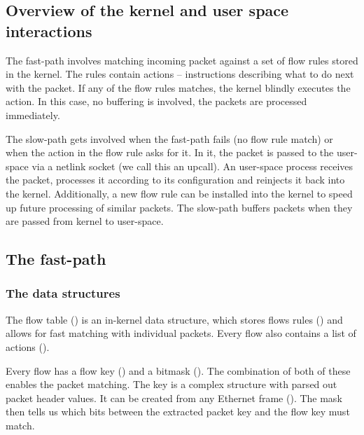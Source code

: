 \subsection{Overview of the kernel and user space interactions}
\label{overview-of-the-kernel-and-user-space-interactions}

The fast-path involves matching incoming packet against a set of flow rules stored in the kernel. The rules contain actions -- instructions describing what to do next with the packet. If any of the flow rules matches, the kernel blindly executes the action. In this case, no buffering is involved, the packets are processed immediately.

The slow-path gets involved when the fast-path fails (no flow rule match) or when the action in the flow rule asks for it. In it, the packet is passed to the user-space via a netlink socket (we call this an upcall). An user-space process receives the packet, processes it according to its configuration and reinjects it back into the kernel. Additionally, a new flow rule can be installed into the kernel to speed up future processing of similar packets. The slow-path buffers packets when they are passed from kernel to user-space.

\subsection{The fast-path}
\label{the-fast-path}

\subsubsection{The data structures}
\label{the-data-structures}

The flow table (\href{https://elixir.bootlin.com/linux/v6.2.6/source/net/openvswitch/flow_table.h\#L62}{}) is an in-kernel data structure, which stores flows rules (\href{https://elixir.bootlin.com/linux/v6.2.6/source/net/openvswitch/flow.h\#L221}{}) and allows for fast matching with individual packets. Every flow also contains a list of actions (\href{https://elixir.bootlin.com/linux/v6.2.6/source/net/openvswitch/flow.h\#L206}{}).

Every flow has a flow key (\href{https://elixir.bootlin.com/linux/v6.2.6/source/net/openvswitch/flow.h\#L75}{}) and a bitmask (\href{https://elixir.bootlin.com/linux/v6.2.6/source/net/openvswitch/flow.h\#L183}{}). The combination of both of these enables the packet matching. The key is a complex structure with parsed out packet header values. It can be created from any Ethernet frame (\href{https://elixir.bootlin.com/linux/v6.2.6/source/net/openvswitch/flow.c\#L886}{}). The mask then tells us which bits between the extracted packet key and the flow key must match.



